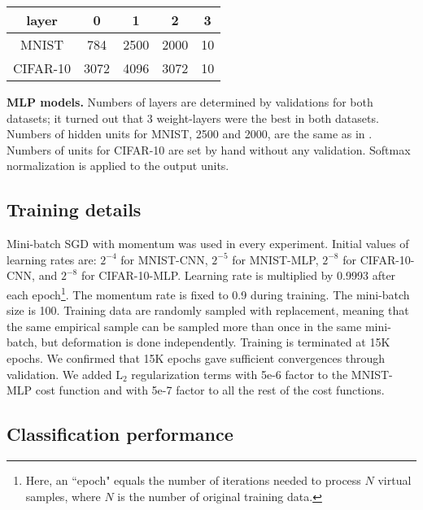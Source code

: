 \documentclass[10pt,twocolumn,letterpaper]{article}
\begin{document}
\begin{table}[t]
\begin{center}
{\begin{tabular}{|c|ccccccccc|}
\hline
\end{tabular}
\newline
\vspace{0.1cm}
\newline
\begin{tabular}{|c|cccc|}
\hline
layer & 0 & 1 & 2 & 3 \\
\hline
MNIST & 784 & 2500 & 2000 & 10 \\
CIFAR-10 & 3072 & 4096 & 3072 & 10 \\
\hline
\end{tabular}
}
\end{center}
\label{table-arch}
\end{table}

{\bf MLP models.}
Numbers of layers are determined by validations for both
datasets; it turned out that 3 weight-layers were the best in both datasets. 
Numbers of hidden units for MNIST, 2500 and 2000, are the same as in
\cite{Ciresan:2010}.
Numbers of units for CIFAR-10 are set by hand without any validation.
Softmax normalization is applied to the output units.



\subsection{Training details}

Mini-batch SGD with momentum was used in every experiment.
Initial values of learning rates are: 
$2^{-4}$ for MNIST-CNN,
$2^{-5}$ for MNIST-MLP,
$2^{-8}$ for CIFAR-10-CNN, and
$2^{-8}$ for CIFAR-10-MLP.
Learning rate is multiplied by 0.9993 after each epoch\footnote{Here,
an ``epoch" equals the number of iterations needed to process $N$ virtual samples, where $N$ is the number of 
original training data.}.
The momentum rate is fixed to 0.9 during training.
The mini-batch size is 100.
Training data are randomly sampled with replacement,
meaning that the same empirical sample can be sampled 
more than once in the same mini-batch, 
but deformation is done independently.
Training is terminated at 15K epochs.
We confirmed that 15K epochs gave sufficient convergences through validation.
We added $\mathrm{L}_2$ regularization terms 
with 5e-6 factor to the MNIST-MLP cost function and 
with 5e-7 factor to all the rest of the cost functions.





\subsection{Classification performance}
\end{document}
